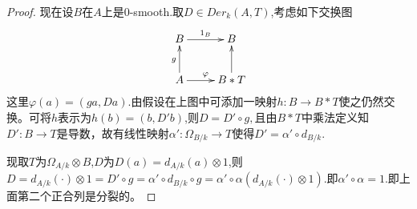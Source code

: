 \documentclass[UTF8]{article}
\begin{document}
\begin{proof}
现在设$B$在$A$上是0-smooth.取$D\in Der_{k}(A,T)$,考虑如下交换图
$$
\xymatrix{
B\ar[r]^{1_{B}}&B\\
A\ar[u]^{g}\ar[r]^{\varphi}&B*T\ar[u]
}
$$
这里$\varphi(a)=(ga,Da)$.由假设在上图中可添加一映射$h:B\rightarrow B*T$使之仍然交换。可将$h$表示为$h(b)=(b,D'b)$,则$D=D'\circ g,$且由$B*T$中乘法定义知$D':B\rightarrow T$是导数，故有线性映射$\alpha':\Omega_{B/k}\rightarrow T$使得$D'=\alpha'\circ d_{B/k}$.

现取$T$为$\Omega_{A/k}\otimes B$,$D$为$D(a)=d_{A/k}(a)\otimes 1$,则$D=d_{A/k}(\cdot)\otimes 1=D'\circ g=\alpha'\circ d_{B/k}\circ g=\alpha'\circ \alpha(d_{A/k}(\cdot)\otimes 1).$即$\alpha'\circ \alpha=1$.即上面第二个正合列是分裂的。
\end{proof} 
\end{document}

